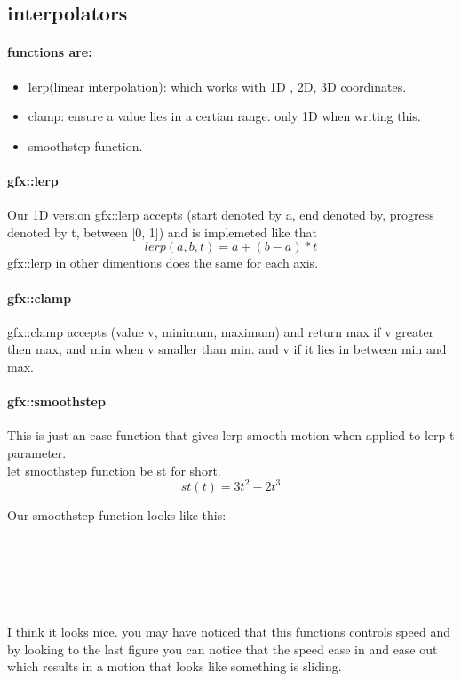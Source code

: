 \subsection{interpolators}
\paragraph{functions are:}
\begin{itemize}
  \item{lerp(linear interpolation): which works with 1D , 2D, 3D coordinates.}
  \item{clamp: ensure a value lies in a certian range. only 1D when writing this.}
  \item{smoothstep function.}
\end{itemize}

\paragraph{gfx::lerp}
  Our 1D version gfx::lerp accepts (start denoted by a, end denoted by, progress denoted by t, between [0, 1]) and is implemeted like that
  $$lerp(a, b, t) = a + (b - a) * t$$
  gfx::lerp in other dimentions does the same for each axis.

\paragraph{gfx::clamp}
  gfx::clamp accepts (value v, minimum, maximum) and return max if v greater then max, and min when v smaller than min.
  and v if it lies in between min and max.

\paragraph{gfx::smoothstep}
  This is just an ease function that gives lerp smooth motion when applied to lerp t parameter.\\
  let smoothstep function be st for short.
  $$st(t) = 3t^{2} - 2t^{3}$$

Our smoothstep function looks like this:-  \\\\\\\\\\\\
  \begin{center}
  \end{center}

I think it looks nice. you may have noticed that this functions controls speed and by looking to the last figure
you can notice that the speed ease in and ease out which results in a motion that looks like something is sliding.
